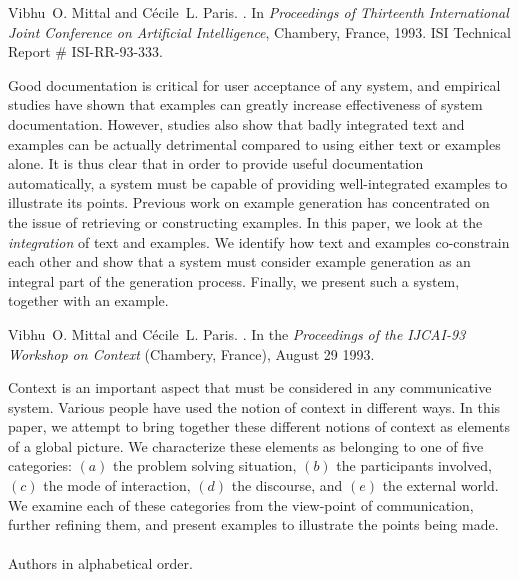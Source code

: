 \begin{thebibliography}{10}
Vibhu~O. Mittal and C{\'e}cile~L. Paris.
.
\newblock In {\em Proceedings of {\it Thirteenth International Joint Conference
  on Artificial Intelligence\/}}, Chambery, France, 1993.
\newblock ISI Technical Report \# ISI-RR-93-333.

{\leftskip=0.1in\rightskip=0.1in\begin{small}\par{}Good
  documentation is critical for user acceptance of any system, and empirical
  studies have shown that examples can greatly increase effectiveness of system
  documentation. However, studies also show that badly integrated text and
  examples can be actually detrimental compared to using either text or
  examples alone. It is thus clear that in order to provide useful
  documentation automatically, a system must be capable of providing
  well-integrated examples to illustrate its points. Previous work on example
  generation has concentrated on the issue of retrieving or constructing
  examples. In this paper, we look at the {\em integration\/} of text and
  examples. We identify how text and examples co-constrain each other and show
  that a system must consider example generation as an integral part of the
  generation process. Finally, we present such a system, together with an
  example.\end{small}\par}
\noindent\hspace*{\itemindent}{\leftskip=0.1in\rightskip=0.1in\hrulefill}

Vibhu~O. Mittal and C{\'e}cile~L. Paris.
.
\newblock In the {\it Proceedings of the IJCAI-93 Workshop on Context}
  (Chambery, France), August 29 1993.

{\leftskip=0.1in\rightskip=0.1in\begin{small}\par{}Context is an important aspect that must be considered in any communicative
  system. Various people have used the notion of context in different ways. In
  this paper, we attempt to bring together these different notions of context
  as elements of a global picture. We characterize these elements as belonging
  to one of five categories: $(a)$ the problem solving situation, $(b)$ the
  participants involved, $(c)$ the mode of interaction, $(d)$ the discourse,
  and $(e)$ the external world. We examine each of these categories from the
  view-point of communication, further refining them, and present examples to
  illustrate the points being made. \\ \\ Authors in alphabetical
  order.\end{small}\par}
\noindent\hspace*{\itemindent}{\leftskip=0.1in\rightskip=0.1in\hrulefill}


\end{thebibliography}
